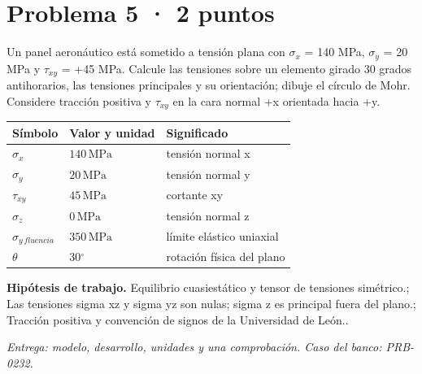 \par\medskip\noindent\begin{minipage}{\linewidth}

\section{Problema 5 · 2 puntos}

Un panel aeronáutico está sometido a tensión plana con $\sigma_x$ = 140 MPa, $\sigma_y$ = 20 MPa y $\tau_{xy}$ = +45 MPa. Calcule las tensiones sobre un elemento girado 30 grados antihorarios, las tensiones principales y su orientación; dibuje el círculo de Mohr. Considere tracción positiva y $\tau_{xy}$ en la cara normal +x orientada hacia +y.

\par\medskip\noindent\begin{tabular}{@{}p{.18\linewidth}p{.26\linewidth}p{.48\linewidth}@{}}
\toprule Símbolo & Valor y unidad & Significado\\\midrule
$\sigma_{x}$ & $140\,\mathrm{MPa}$ & tensión normal x\\
$\sigma_{y}$ & $20\,\mathrm{MPa}$ & tensión normal y\\
$\tau_{xy}$ & $45\,\mathrm{MPa}$ & cortante xy\\
$\sigma_{z}$ & $0\,\mathrm{MPa}$ & tensión normal z\\
$\sigma_{y\,fluencia}$ & $350\,\mathrm{MPa}$ & límite elástico uniaxial\\
$\theta$ & $30{}^{\circ}$ & rotación física del plano\\
\bottomrule\end{tabular}\par\medskip



\par\textbf{Hipótesis de trabajo.} Equilibrio cuasiestático y tensor de tensiones simétrico.; Las tensiones sigma xz y sigma yz son nulas; sigma z es principal fuera del plano.; Tracción positiva y convención de signos de la Universidad de León..

\par\textit{Entrega: modelo, desarrollo, unidades y una comprobación. Caso del banco: PRB-0232.}\end{minipage}\par\medskip


